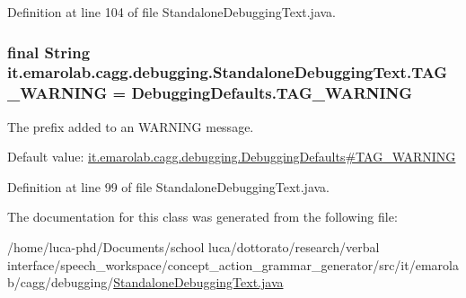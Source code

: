 Definition at line 104 of file Standalone\-Debugging\-Text.\-java.

\hypertarget{classit_1_1emarolab_1_1cagg_1_1debugging_1_1StandaloneDebuggingText_a52718612ef346374592fba3ac72bb0be}{
\subsubsection[{T\-A\-G\-\_\-\-W\-A\-R\-N\-I\-N\-G}]{\setlength{\rightskip}{0pt plus 5cm}final String it.\-emarolab.\-cagg.\-debugging.\-Standalone\-Debugging\-Text.\-T\-A\-G\-\_\-\-W\-A\-R\-N\-I\-N\-G = Debugging\-Defaults.\-T\-A\-G\-\_\-\-W\-A\-R\-N\-I\-N\-G\hspace{0.3cm}{\ttfamily [static]}}}\label{classit_1_1emarolab_1_1cagg_1_1debugging_1_1StandaloneDebuggingText_a52718612ef346374592fba3ac72bb0be}
The prefix added to an W\-A\-R\-N\-I\-N\-G message.\par
 Default value\-: \hyperlink{classit_1_1emarolab_1_1cagg_1_1debugging_1_1DebuggingDefaults_a404289c07e43a1d8bbbb5386a8350fea}{it.\-emarolab.\-cagg.\-debugging.\-Debugging\-Defaults\#\-T\-A\-G\-\_\-\-W\-A\-R\-N\-I\-N\-G} 

Definition at line 99 of file Standalone\-Debugging\-Text.\-java.



The documentation for this class was generated from the following file\-:\begin{DoxyCompactItemize}
\item 
/home/luca-\/phd/\-Documents/school luca/dottorato/research/verbal interface/speech\-\_\-workspace/concept\-\_\-action\-\_\-grammar\-\_\-generator/src/it/emarolab/cagg/debugging/\hyperlink{StandaloneDebuggingText_8java}{Standalone\-Debugging\-Text.\-java}\end{DoxyCompactItemize}
